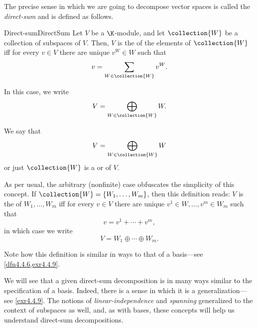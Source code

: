 The precise sense in which we are going to decompose vector spaces is called the \emph{direct-sum} and is defined as follows.
\begin{dfn}{Direct-sum}{DirectSum}
	Let $V$ be a $\K$-module, and let $\collection{W}$ be a collection of subspaces of $V$.  Then, $V$ is the  of the elements of $\collection{W}$ iff for every $v\in V$ there are unique $v^W\in W$ such that
	\begin{equation}\label{eqn4.4.2}
		v=\sum _{W\in \collection{W}}v^W.
	\end{equation}
	\begin{rmk}
		In this case, we write
		\begin{equation}
			V=\bigoplus _{W\in \collection{W}}W.
		\end{equation}
	\end{rmk}
	\begin{rmk}
		We say that
		\begin{equation}
			V=\bigoplus _{W\in \collection{W}}W
		\end{equation}
		or just $\collection{W}$ is a  or  of $V$.
	\end{rmk}
	\begin{rmk}
		As per usual, the arbitrary (nonfinite) case obfuscates the simplicity of this concept.  If $\collection{W}=\{ W_1,\ldots ,W_m\}$, then this definition reads:  $V$ is the  of $W_1,\ldots ,W_m$ iff for every $v\in V$ there are unique $v^1\in W,\ldots ,v^m\in W_m$ such that
		\begin{equation}
			v=v^1+\cdots +v^m,
		\end{equation}
		in which case we write
		\begin{equation}
			V=W_1\oplus \cdots \oplus W_m.
		\end{equation}\index[notation]{$W_1\oplus \cdots \oplus W_m$}
	\end{rmk}
	\begin{rmk}
		Note how this definition is similar in ways to that of a basis---see \cref{dfn4.4.6,exr4.4.9}.
	\end{rmk}
\end{dfn}
We will see that a given direct-sum decomposition is in many ways similar to the specification of a basis.  Indeed, there is a sense in which it is a generalization---see \cref{exr4.4.9}.  The notions of \emph{linear-independence} and \emph{spanning} generalized to the context of subspaces as well, and, as with bases, these concepts will help us understand direct-sum decompositions.
